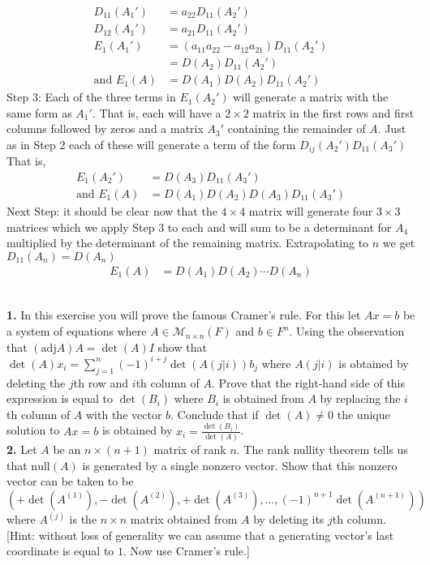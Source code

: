 \documentclass[11pt]{amsart}
\theoremstyle{definition}  %
\begin{document}
\begin{align*}
	D_{11}(A_1') &= a_{22}D_{11}(A_2') \\
	D_{12}(A_1') &= a_{21}D_{11}(A_2') \\
	E_1(A_1') &= (a_{11}a_{22} - a_{12}a_{21})D_{11}(A_2')	\\
	&= D(A_2)D_{11}(A_2') \\
	\text{and } E_1(A) &= D(A_1)D(A_2)D_{11}(A_2')
\end{align*}Step 3: Each of the three terms in $E_1(A_2')$ will generate a matrix with the same form as $A_1'$.  That is, each will have a $2\times 2$ matrix in the first rows and first columns followed by zeros and a matrix $A_3'$ containing the remainder of $A$.  Just as in Step 2 each of these will generate a term of the form $D_{ij}(A_2')D_{11}(A_3')$  That is, 
\begin{align*}
	E_1(A_2') &= D(A_3)D_{11}(A_3') \\
	\text{and } E_1(A) &= D(A_1)D(A_2)D(A_3)D_{11}(A_3')
\end{align*}Next Step: it should be clear now that the $4\times 4$ matrix will generate four $3 \times 3$ matrices which we apply Step 3 to each and will sum to be a determinant for $A_4$ multiplied by the determinant of the remaining matrix.  Extrapolating to $n$ we get $D_{11}(A_n) = D(A_n)$
\begin{align*}
	E_1(A) &= D(A_1)D(A_2)\cdots D(A_n)
\end{align*}







\vfill
\eject
{}\\
{\bf 1.} In this exercise you will prove the famous Cramer's rule. For this let $Ax = b$ be a system of equations where $A \in \mathcal{M}_{n \times n}(F)$ and $b \in F^n$.  Using the observation 
that $( \mathrm{adj} A) A = \det(A) I$ show that $ \det (A) x_i = \sum_{j = 1}^n   (-1)^{i+j} \det ( A(j|i)) b_j$ where $A(j|i)$ is obtained by deleting the $j$th row and $i$th column of $A$.
Prove that the right-hand side of this expression is equal to $\det(B_i)$ where $B_i$ is obtained from $A$ by replacing the $i$th column of $A$ with the vector $b$. 
Conclude that if $\det(A) \neq 0$ the unique solution to $Ax = b$ is obtained by $x_i = \frac{\det (B_i)}{\det(A)}$.\\

\vskip 0.1cm
\noindent 
{\bf 2.} Let $A$ be an $n \times (n+1)$ matrix of rank $n$. The rank nullity theorem tells us that $\mathrm{null}(A)$ is generated by a single nonzero vector. Show that 
this nonzero vector can be taken to be 
$$(+ \det(A^{(1)}) , - \det(A^{(2)}), + \det (A^{(3)}), \ldots, (-1)^{n+1} \det (A^{(n+1)}))$$
 where $A^{(j)}$ is the $n \times n$ matrix obtained 
from $A$ by deleting its $j$th column. [Hint: without loss of generality we can assume that a generating vector's last coordinate is equal to $1$. Now use Cramer's rule.]\\
\end{document}
